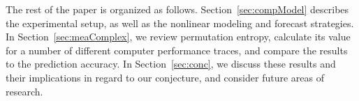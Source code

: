  The rest of the paper is organized as follows.
 Section~\ref{sec:compModel} describes the experimental setup, as well
 as the nonlinear modeling and forecast strategies.  In
 Section~\ref{sec:meaComplex}, we review permutation entropy, calculate
 its value for a number of different computer performance traces, and
 compare the results to the prediction accuracy.  In
 Section~\ref{sec:conc}, we discuss these results and their
 implications in regard to our conjecture, and consider future areas of
 research.

